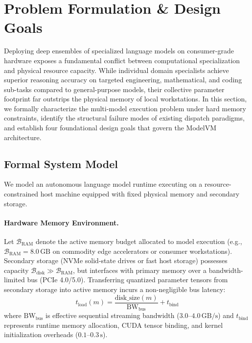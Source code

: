 \section{Problem Formulation \& Design Goals}
\label{sec:problem_formulation}

Deploying deep ensembles of specialized language models on consumer-grade hardware exposes a fundamental conflict between computational specialization and physical resource capacity. While individual domain specialists achieve superior reasoning accuracy on targeted engineering, mathematical, and coding sub-tasks compared to general-purpose models, their collective parameter footprint far outstrips the physical memory of local workstations. In this section, we formally characterize the multi-model execution problem under hard memory constraints, identify the structural failure modes of existing dispatch paradigms, and establish four foundational design goals that govern the ModelVM architecture.

\subsection{Formal System Model}
\label{sec:system_model}

We model an autonomous language model runtime executing on a resource-constrained host machine equipped with fixed physical memory and secondary storage.

\paragraph{Hardware Memory Environment.}
Let $\mathcal{B}_{\text{RAM}}$ denote the active memory budget allocated to model execution (e.g., $\mathcal{B}_{\text{RAM}} = 8.0\,\text{GB}$ on commodity edge accelerators or consumer workstations). Secondary storage (NVMe solid-state drives or fast host storage) possesses capacity $\mathcal{B}_{\text{disk}} \gg \mathcal{B}_{\text{RAM}}$, but interfaces with primary memory over a bandwidth-limited bus (PCIe 4.0/5.0). Transferring quantized parameter tensors from secondary storage into active memory incurs a non-negligible bus latency:
\begin{equation}
t_{\text{load}}(m) = \frac{\text{disk\_size}(m)}{\text{BW}_{\text{bus}}} + t_{\text{bind}}
\end{equation}
where $\text{BW}_{\text{bus}}$ is effective sequential streaming bandwidth ($3.0$--$4.0\,\text{GB/s}$) and $t_{\text{bind}}$ represents runtime memory allocation, CUDA tensor binding, and kernel initialization overheads ($0.1$--$0.3\,\text{s}$).

